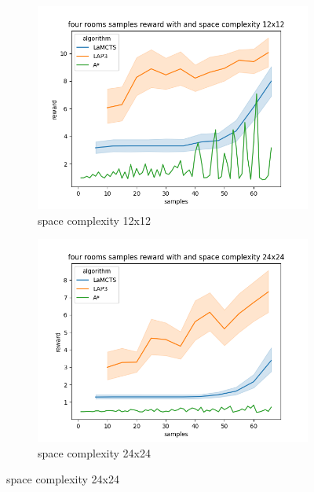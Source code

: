\documentclass[bibliography=totoc]{scrartcl}
\begin{document}
\begin{figure}[H]
	\centering
	\begin{subfigure}[b]{0.3\linewidth}
		\includegraphics[width=\linewidth]{img/four_rooms_samples__reward_b_8_LAP3_MCTS_AStar_interrupted_12.png}
        \caption{space complexity 12x12}	
    \end{subfigure}
	\hspace{0.02\textwidth}
	\begin{subfigure}[b]{0.3\linewidth}
		\includegraphics[width=\linewidth]{img/four_rooms_samples__reward_b_8_LAP3_MCTS_AStar_interrupted_24.png}
		\caption{space complexity 24x24}
	\end{subfigure}
	\hspace{0.02\textwidth}

\end{figure}
\end{document}
